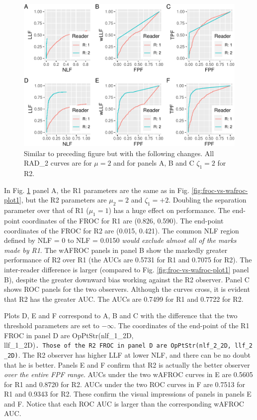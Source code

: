 \documentclass[
]{book}
\begin{document}
\begin{figure}
\centering
\includegraphics{13c-froc-vs-wafroc_files/figure-latex/froc-vs-wafroc-plot2-1.pdf}
\caption{\label{fig:froc-vs-wafroc-plot2}Similar to preceding figure but with the following changes. All RAD\_2 curves are for \(\mu = 2\) and for panels A, B and C \(\zeta_1 = 2\) for R2.}
\end{figure}

In Fig. \ref{fig:froc-vs-wafroc-plot2} panel A, the R1 parameters are the same as in Fig. \ref{fig:froc-vs-wafroc-plot1}, but the R2 parameters are \(\mu_{2} = 2\) and \(\zeta_1 = +2\). Doubling the separation parameter over that of R1 (\(\mu_{1} = 1\)) has a huge effect on performance. The end-point coordinates of the FROC for R1 are (0.826, 0.590). The end-point coordinates of the FROC for R2 are (0.015, 0.421). The common NLF region defined by NLF = 0 to NLF = 0.0150 \emph{would exclude almost all of the marks made by R1}. The wAFROC panels in panel B show the markedly greater performance of R2 over R1 (the AUCs are 0.5731 for R1 and 0.7075 for R2). The inter-reader difference is larger (compared to Fig. \ref{fig:froc-vs-wafroc-plot1} panel B), despite the greater downward bias working against the R2 observer. Panel C shows ROC panels for the two observers. Although the curves cross, it is evident that R2 has the greater AUC. The AUCs are 0.7499 for R1 and 0.7722 for R2.

Plots D, E and F correspond to A, B and C with the difference that the two threshold parameters are set to \(-\infty\). The coordinates of the end-point of the R1 FROC in panel D are OpPtStr(nlf\_1\_2D, llf\_1\_2D)\texttt{.\ Those\ of\ the\ R2\ FROC\ in\ panel\ D\ are\ OpPtStr(nlf\_2\_2D,\ llf\_2\_2D)}. The R2 observer has higher LLF at lower NLF, and there can be no doubt that he is better. Panels E and F confirm that R2 is actually the better observer \emph{over the entire FPF range}. AUCs under the two wAFROC curves in E are 0.5605 for R1 and 0.8720 for R2. AUCs under the two ROC curves in F are 0.7513 for R1 and 0.9343 for R2. These confirm the visual impressions of panels in panels E and F. Notice that each ROC AUC is larger than the corresponding wAFROC AUC.
\end{document}
